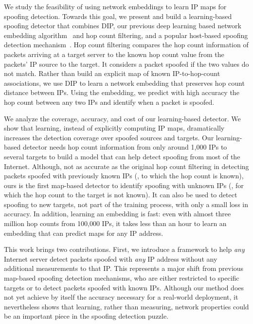 %

We study the feasibility of using network embeddings to learn IP maps for spoofing detection. Towards this goal, we present and build a learning-based spoofing detector that combines DIP, our previous deep learning based network embedding algorithm~\citep{dip,dip-ccr} and hop count filtering, and a popular host-based spoofing detection mechanism~\citep{hcf}. Hop count filtering compares the hop count information of packets arriving at a target server to the known hop count value from the packets' IP source to the target. It considers a packet spoofed if the two values do not match. 
%
Rather than build an explicit map of known IP-to-hop-count associations, we use DIP to learn a network embedding that preserves hop count distance between IPs. Using the embedding, we predict with high accuracy the hop count between any two IPs and identify when a packet is spoofed.

We analyze the coverage, accuracy, and cost of our learning-based detector. We show that learning, instead of explicitly computing IP maps, dramatically increases the detection coverage over spoofed sources and targets. Our learning-based detector needs hop count information from only around 1,000 IPs to several targets to build a model that can help detect spoofing from most of the Internet. Although, not as accurate as the original hop count filtering in detecting packets spoofed with previously known IPs (\ie{}, to which the hop count is known), ours is the first map-based detector to identify spoofing with unknown IPs (\ie{}, for which the hop count to the target is not known). It can also be used to detect spoofing to new targets, not part of the training process, with only a small loss in accuracy. In addition, learning an embedding is fast: even with almost three million hop counts from 100,000 IPs, it takes less than an hour to learn an embedding that can predict maps for any IP address.

This work brings two contributions. First, we introduce a framework to help {\em any} Internet server detect packets spoofed with {\em any} IP address without any additional measurements to that IP. This represents a major shift from previous map-based spoofing detection mechanisms, who are either restricted to specific targets or to detect packets spoofed with known IPs. Although our method does not yet achieve by itself the accuracy necessary for a real-world deployment, it nevertheless shows that learning, rather than measuring, network properties could be an important piece in the spoofing detection puzzle.

